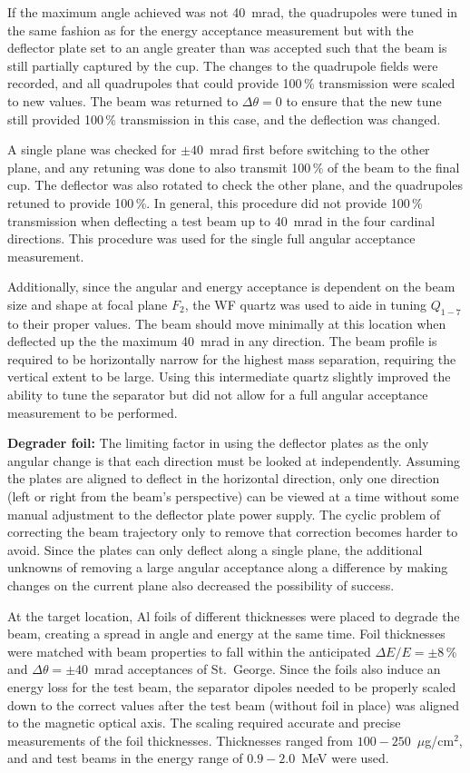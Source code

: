 If the maximum angle achieved was not 40~mrad, the quadrupoles were
tuned in the same fashion as for the energy acceptance measurement but
with the deflector plate set to an angle greater than was accepted such
that the beam is still partially captured by the cup. The changes to the
quadrupole fields were recorded, and all quadrupoles that could provide
100\,\% transmission were scaled to new values. The beam was returned to
$\Delta\theta = 0$ to ensure that the new tune still provided 100\,\%
transmission in this case, and the deflection was changed.

A single plane was checked for $\pm 40$~mrad first before switching to
the other plane, and any retuning was done to also transmit 100\,\% of
the beam to the final cup. The deflector was also rotated to check the
other plane, and the quadrupoles retuned to provide 100\,\%. In general,
this procedure did not provide 100\,\% transmission when deflecting a
test beam up to 40~mrad in the four cardinal directions. This procedure
was used for the single full angular acceptance measurement.

Additionally, since the angular and energy acceptance is dependent on
the beam size and shape at focal plane $F_2$, the WF quartz was used to
aide in tuning $Q_{1-7}$ to their proper values. The beam should move
minimally at this location when deflected up the the maximum 40~mrad in
any direction. The beam profile is required to be horizontally narrow
for the highest mass separation, requiring the vertical extent to be
large. Using this intermediate quartz slightly improved the ability to
tune the separator but did not allow for a full angular acceptance
measurement to be performed.

\textbf{Degrader foil:}
The limiting factor in using the deflector plates as the only angular
change is that each direction must be looked at independently. Assuming
the plates are aligned to deflect in the horizontal direction, only one
direction (left or right from the beam's perspective) can be viewed at a
time without some manual adjustment to the deflector plate power supply.
The cyclic problem of correcting the beam trajectory only to remove that
correction becomes harder to avoid. Since the plates can only deflect
along a single plane, the additional unknowns of removing a large
angular acceptance along a difference by making changes on the current
plane also decreased the possibility of success.

At the target location, Al foils of different thicknesses were placed to
degrade the beam, creating a spread in angle and energy at the same
time. Foil thicknesses were matched with beam properties to fall within
the anticipated $\Delta E/E = \pm 8$\,\% and $\Delta\theta = \pm
40$~mrad acceptances of St.\ George. Since the foils also induce an
energy loss for the test beam, the separator dipoles needed to be
properly scaled down to the correct values after the test beam (without
foil in place) was aligned to the magnetic optical axis. The scaling
required accurate and precise measurements of the foil thicknesses.
Thicknesses ranged from $100-250$~$\mu$g/cm$^2$, and  and
 test beams in the energy range of $0.9-2.0$~MeV were used.

